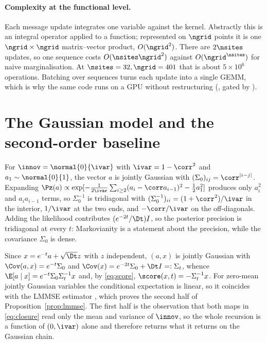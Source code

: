 \paragraph{Complexity at the functional level.} Each message update integrates one variable
against the kernel. Abstractly this is an integral operator applied to a function; represented on
$\ngrid$ points it is one $\ngrid\times\ngrid$ matrix--vector product, $O(\ngrid^2)$. There are
$2\nsites$ updates, so one sequence costs $O(\nsites\ngrid^2)$ against $O(\ngrid^{\nsites})$ for
naive marginalisation. At $\nsites=32,\ngrid=401$ that is about $5\times10^6$ operations.
Batching over sequences turns each update into a single GEMM, which is why the same code runs on
a GPU without restructuring (, gated by
).

\section{The Gaussian model and the second-order baseline}
\label{app:lmmse}

For $\innov=\normal{0}{\ivar}$ with $\ivar=1-\corr^2$ and $a_1\sim\normal{0}{1}$, the vector $a$
is jointly Gaussian with $(\Sigma_0)_{ij}=\corr^{|i-j|}$. Expanding
$\Pz(a)\propto\exp[-\tfrac{1}{2\ivar}\sum_{i\ge2}(a_i-\corr a_{i-1})^2 - \tfrac12 a_1^2]$
produces only $a_i^2$ and $a_ia_{i-1}$ terms, so $\Sigma_0^{-1}$ is tridiagonal with
$(\Sigma_0^{-1})_{ii} = (1+\corr^2)/\ivar$ in the interior, $1/\ivar$ at the two ends, and
$-\corr/\ivar$ on the off-diagonals. Adding the likelihood contributes $(e^{-2t}/\Dt)I$, so the
posterior precision is tridiagonal at every $t$: Markovianity is a statement about the precision,
while the covariance $\Sigma_0$ is dense.

Since $x = e^{-t}a + \sqrt{\Dt}z$ with $z$ independent, $(a,x)$ is jointly Gaussian with
$\Cov(a,x) = e^{-t}\Sigma_0$ and $\Cov(x) = e^{-2t}\Sigma_0 + \Dt I =: \Sigma_t$, whence
$\E[a\mid x] = e^{-t}\Sigma_0\Sigma_t^{-1}x$ and, by \eqref{eq:score},
$\score(x,t) = -\Sigma_t^{-1}x$. For zero-mean jointly Gaussian variables the conditional
expectation is linear, so it coincides with the LMMSE estimator \citep{kay1993}, which proves the
second half of Proposition~\ref{prop:lmmse}. The first half is the observation that both maps in
\eqref{eq:closure} read only the mean and variance of $\innov$, so the whole recursion is a
function of $(0,\ivar)$ alone and therefore returns what it returns on the Gaussian chain.

